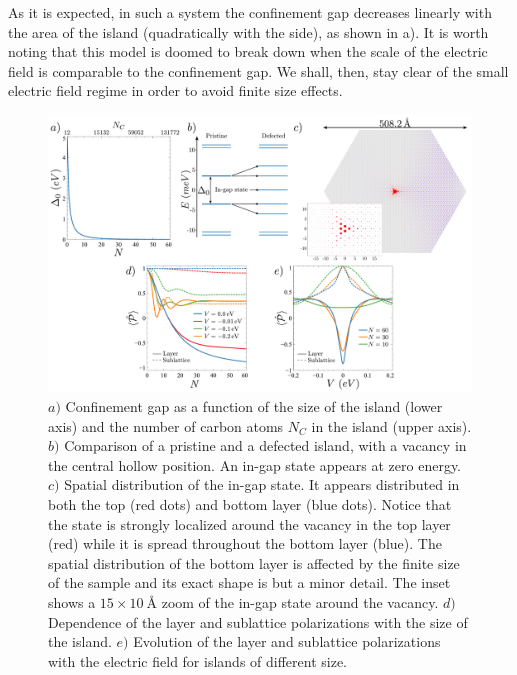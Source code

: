 As it is expected, in such a system the confinement gap decreases linearly with the area of the island (quadratically with the side), as shown in a). It is worth noting that this model is doomed to break down when the scale of the electric field is comparable to the confinement gap. We shall, then, stay clear of the small electric field regime in order to avoid finite size effects.
\begin{figure}[!ht!]
\centering
\includegraphics[width=\textwidth]{artlat/fig/confinement.pdf}
\vspace{-20pt}
\caption{$a)$ Confinement gap as a function of the size of the island (lower axis) and the number of carbon atoms $N_C$ in the island (upper axis). $b)$ Comparison of a pristine and a defected island, with a vacancy in the central hollow position. An in-gap state appears at zero energy. $c)$ Spatial distribution of the in-gap state. It appears distributed in both the top (red dots) and bottom layer (blue dots). Notice that the state is strongly localized around the vacancy in the top layer (red) while it is spread throughout the bottom layer (blue). The spatial distribution of the bottom layer is affected by the finite size of the sample and its exact shape is but a minor detail. The inset shows a $15\times\SI{10}{\angstrom}$ zoom of the in-gap state around the vacancy. $d)$ Dependence of the layer and sublattice polarizations with the size of the island. $e)$ Evolution of the layer and sublattice polarizations with the electric field for islands of different size.}
\label{confinement}
\end{figure}

